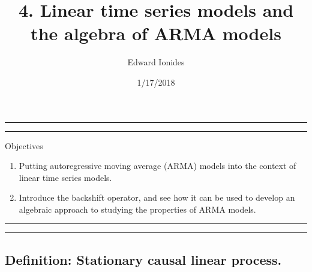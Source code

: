 \documentclass[]{article}
\title{4. Linear time series models and the algebra of ARMA models}
\author{Edward Ionides}
\date{1/17/2018}
\begin{document}
\maketitle

{
\setcounter{tocdepth}{2}
\tableofcontents
}
\newcommand\prob{\mathbb{P}}
\newcommand\E{\mathbb{E}}
\newcommand\var{\mathrm{Var}}
\newcommand\cov{\mathrm{Cov}}
\newcommand\loglik{\ell}
\newcommand\R{\mathbb{R}}
\newcommand\data[1]{#1^*}
\newcommand\given{\, ; \,}
\newcommand\transpose{\scriptsize{T}}
\newcommand\eqspace{\quad\quad\quad}
\newcommand\ar{\phi}
\newcommand\ma{\psi}




\begin{center}\rule{0.5\linewidth}{\linethickness}\end{center}

\begin{center}\rule{0.5\linewidth}{\linethickness}\end{center}

Objectives

\begin{enumerate}
\def\labelenumi{\arabic{enumi}.}
\item
  Putting autoregressive moving average (ARMA) models into the context
  of linear time series models.
\item
  Introduce the backshift operator, and see how it can be used to
  develop an algebraic approach to studying the properties of ARMA
  models.
\end{enumerate}

\begin{center}\rule{0.5\linewidth}{\linethickness}\end{center}

\begin{center}\rule{0.5\linewidth}{\linethickness}\end{center}

\subsection{Definition: Stationary causal linear
process.}\label{definition-stationary-causal-linear-process.}
\end{document}
